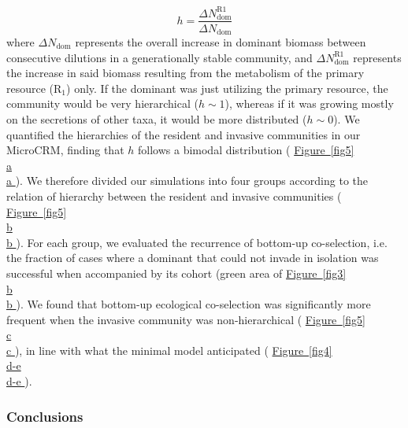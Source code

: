 \documentclass[a4paper,10pt]{article}
\newcommand{\figref}[2][]{%
  \hyperref[{#2}]{%
    Figure~\ref*{#2}%
    \ifx\\#1\\%
    \else
      #1%
    \fi
  }%
}
\begin{document}
\begin{equation}
h = \frac{\Delta N_{\mathrm{dom}}^{\mathrm{R1}}}{\Delta N_{\mathrm{dom}}}
\label{eq:h}
\end{equation}
%
where $\Delta N_{\mathrm{dom}}$ represents the overall increase in dominant biomass
between consecutive dilutions in a generationally stable community,
and $\Delta N_{\mathrm{dom}}^{\mathrm{R1}}$
represents the increase in said biomass resulting from the metabolism of the primary resource
($\mathrm{R}_1$) only.
If the dominant was just utilizing the primary resource, the community would be very
hierarchical ($h \sim 1$),
whereas if it was growing mostly on the secretions of other taxa,
it would be more distributed ($h \sim 0$).
We quantified the hierarchies of the resident and invasive communities in our MicroCRM,
finding that $h$ follows a bimodal distribution (\figref[a]{fig5}).
We therefore divided our simulations into four groups according to the relation
of hierarchy between the resident and invasive communities (\figref[b]{fig5}).
For each group, we evaluated the recurrence of bottom-up co-selection,
i.e. the fraction of cases where a dominant that could not invade in isolation
was successful when accompanied by its cohort
(green area of \figref[b]{fig3}).
We found that bottom-up ecological co-selection
was significantly more frequent when the invasive community was
non-hierarchical (\figref[c]{fig5}),
in line with what the minimal model anticipated
(\figref[d-e]{fig4}).

\subsubsection*{Conclusions}

\end{document}

